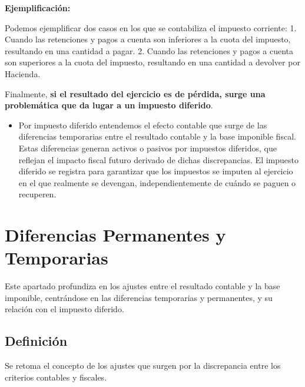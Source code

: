 \documentclass[
  paper=a4,
  ,captions=tableheading
]{scrbook}
\providecommand{\tightlist}{%
  \setlength{\itemsep}{0pt}\setlength{\parskip}{0pt}}
\begin{document}
\textbf{Ejemplificación:}

Podemos ejemplificar dos casos en los que se contabiliza el impuesto
corriente: 1. Cuando las retenciones y pagos a cuenta son inferiores a
la cuota del impuesto, resultando en una cantidad a pagar. 2. Cuando las
retenciones y pagos a cuenta son superiores a la cuota del impuesto,
resultando en una cantidad a devolver por Hacienda.

Finalmente, \textbf{si el resultado del ejercicio es de pérdida, surge
una problemática que da lugar a un impuesto diferido}.

\begin{itemize}
\tightlist
\item
  Por impuesto diferido entendemos el efecto contable que surge de las
  diferencias temporarias entre el resultado contable y la base
  imponible fiscal. Estas diferencias generan activos o pasivos por
  impuestos diferidos, que reflejan el impacto fiscal futuro derivado de
  dichas discrepancias. El impuesto diferido se registra para garantizar
  que los impuestos se imputen al ejercicio en el que realmente se
  devengan, independientemente de cuándo se paguen o recuperen.
\end{itemize}

\hypertarget{diferencias-permanentes-y-temporarias}{%
\section{Diferencias Permanentes y
Temporarias}\label{diferencias-permanentes-y-temporarias}}

Este apartado profundiza en los ajustes entre el resultado contable y la
base imponible, centrándose en las diferencias temporarias y
permanentes, y su relación con el impuesto diferido.

\hypertarget{definiciuxf3n}{%
\subsection{Definición}\label{definiciuxf3n}}

Se retoma el concepto de los ajustes que surgen por la discrepancia
entre los criterios contables y fiscales.
\end{document}
